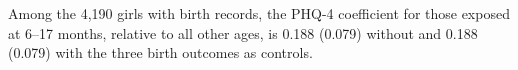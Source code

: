 Among the 4,190 girls with birth records, the PHQ-4 coefficient for those exposed at 6--17 months, relative to all other ages, is 0.188 (0.079) without and 0.188 (0.079) with the three birth outcomes as controls.
